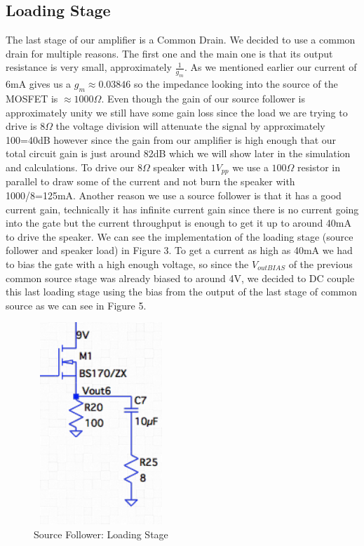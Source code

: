 \documentclass[11pt, twoside, letterpaper]{article}
\begin{document}
\subsection{Loading Stage}
The last stage of our amplifier is a Common Drain. We decided to use a common drain for multiple reasons. The first one and the main one
is that its output resistance is very small, approximately $\frac{1}{g_m}$. As we mentioned earlier our current of 6mA gives us a $g_m\approx0.03846$
so the impedance looking into the source of the MOSFET is $\approx 1000\Omega$. Even though the gain of our source follower is approximately unity we
still have some gain loss since the load we are trying to drive is $8\Omega$ the voltage division will attenuate the signal by approximately 100=40dB 
however since the gain from our amplifier is high enough that our total circuit gain is just around 82dB which we will show later in the simulation 
and calculations. To drive our $8\Omega$ speaker with $1V_{pp}$ we use a $100\Omega$ resistor in parallel to draw some of the current and not burn 
the speaker with 1000/8=125mA. Another reason we use a source follower is that it has a good current gain, technically it has infinite current gain 
since there is no current going into the gate but the current throughput is enough to get it up to around 40mA to drive the speaker. We can see the 
implementation of the loading stage (source follower and speaker load) in Figure 3. To get a current as high as 40mA we had to bias the gate with a 
high enough voltage, so since the $V_{outBIAS}$ of the previous common source stage was already biased to around 4V, we decided to DC couple this 
last loading stage using the bias from the output of the last stage of common source as we can see in Figure 5.

\begin{figure}[htbp]
\begin{center}
\includegraphics[width=2in,height=3in]{SourceFollower.png}
\caption{Source Follower: Loading Stage}
\end{center}
\end{figure}
\FloatBarrier
\end{document}
